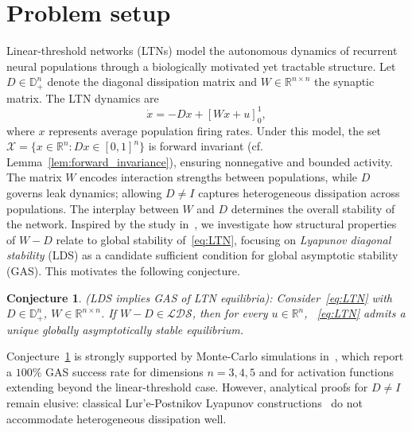 \documentclass[letterpaper, conference]{ieeeconf}
\newtheorem{conjecture}{Conjecture}
\newcommand{\longthmtitle}[1]{\mbox{}{\textit{(#1):}}}
\newcommand{\1}{\mathbf{1}}
\begin{document}
\section{Problem setup}
Linear-threshold networks (LTNs) model the autonomous dynamics of recurrent neural populations through a biologically motivated yet tractable structure. Let \(D \in \mathbb{D}^n_+\) denote the diagonal dissipation matrix and \(W \in \mathbb{R}^{n \times n}\) the synaptic matrix. The LTN dynamics are
\begin{equation}\label{eq:LTN}\tag{LTN}
    \dot x = -Dx + [Wx + u]_0^1,
\end{equation}
where \(x\) represents average population firing rates. Under this model, the set \(\mathcal{X} = \{x \in \mathbb{R}^n : Dx \in [0,1]^n\}\) is forward invariant (cf. Lemma~\ref{lem:forward_invariance}), ensuring nonnegative and bounded activity. The matrix \(W\) encodes interaction strengths between populations, while \(D\) governs leak dynamics; allowing \(D \neq I\) captures heterogeneous dissipation across populations. The interplay between \(W\) and \(D\) determines the overall stability of the network. Inspired by the study in~\cite{FM-TA:95}, we investigate how structural properties of \(W - D\) relate to global stability of~\eqref{eq:LTN}, focusing on \emph{Lyapunov diagonal stability} (LDS) as a candidate sufficient condition for global asymptotic stability
(GAS). This motivates the following conjecture.

\begin{conjecture}\longthmtitle{LDS implies GAS of LTN equilibria}
\label{conj:LDS-GAS}
    Consider~\eqref{eq:LTN} with \(D \in \mathbb{D}^n_+\), \(W \in \mathbb{R}^{n\times n}\).
    If \(W - D \in \mathcal{LDS}\), then for every \(u \in \mathbb{R}^n\),
   ~\eqref{eq:LTN} admits a unique globally asymptotically stable equilibrium.
\end{conjecture}
Conjecture~\ref{conj:LDS-GAS} is strongly supported by Monte-Carlo simulations in~\cite{BS-RW-DA:26}, which report a \(100\%\) GAS success rate for dimensions \(n = 3,4,5\) and for activation functions extending beyond the linear-threshold case. However, analytical proofs for \(D \neq I\) remain elusive: classical Lur’e-Postnikov Lyapunov constructions~\cite{REK:63}
do not accommodate heterogeneous dissipation well.
\end{document}

